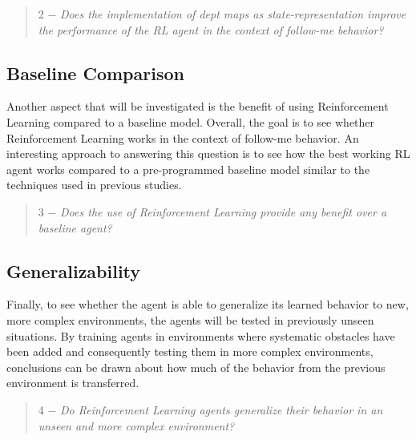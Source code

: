 \begin{quote}
    \label{research2}
    2 $-$ \textit{Does the implementation of dept maps as state-representation improve 
    the performance of the RL agent in the context of follow-me behavior?}
\end{quote}

\subsection{Baseline Comparison}
Another aspect that will be investigated is the benefit of using Reinforcement Learning 
compared to a baseline model. Overall, the goal is to see whether Reinforcement Learning 
works in the context of follow-me behavior. An interesting approach to answering this 
question is to see how the best working RL agent works compared to a pre-programmed 
baseline model similar to the techniques used in previous studies. 

\begin{quote}
    \label{research3}
    3 $-$ \textit{Does the use of Reinforcement Learning provide any benefit over a 
    baseline agent?}
\end{quote}

\subsection{Generalizability}
Finally, to see whether the agent is able to generalize its learned behavior to new,  
more complex environments, the agents will be tested in previously unseen situations.
By training agents in environments where systematic obstacles have been added and 
consequently testing them in more complex environments, conclusions can be drawn 
about how much of the behavior from the previous environment is transferred. 

\begin{quote}
    \label{research4}
    4 $-$ \textit{Do Reinforcement Learning agents generalize their behavior in
    an unseen and more complex environment?}
\end{quote}


